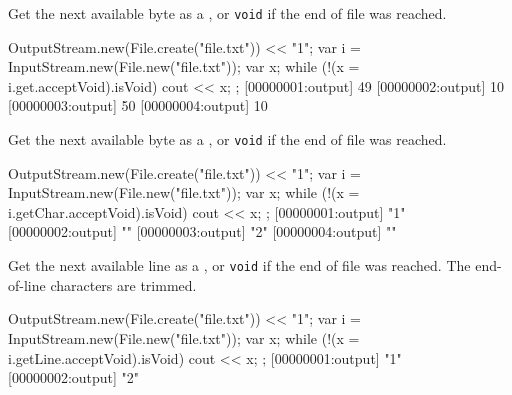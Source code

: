 \begin{urbiscriptapi}
\item[get]
  Get the next available byte as a , or
  \lstinline|void| if the end of file was reached.
\begin{urbiscript}
{
  OutputStream.new(File.create("file.txt")) << "1\n";
  var i = InputStream.new(File.new("file.txt"));
  var x;
  while (!(x = i.get.acceptVoid).isVoid)
    cout << x;
};
[00000001:output] 49
[00000002:output] 10
[00000003:output] 50
[00000004:output] 10
\end{urbiscript}

\item[getChar]
  Get the next available byte as a , or
  \lstinline|void| if the end of file was reached.
\begin{urbiscript}
{
  OutputStream.new(File.create("file.txt")) << "1\n";
  var i = InputStream.new(File.new("file.txt"));
  var x;
  while (!(x = i.getChar.acceptVoid).isVoid)
    cout << x;
};
[00000001:output] "1"
[00000002:output] "\n"
[00000003:output] "2"
[00000004:output] "\n"
\end{urbiscript}

\item[getLine]
  Get the next available line as a , or
  \lstinline|void| if the end of file was reached.  The end-of-line
  characters are trimmed.
\begin{urbiscript}
{
  OutputStream.new(File.create("file.txt")) << "1\n";
  var i = InputStream.new(File.new("file.txt"));
  var x;
  while (!(x = i.getLine.acceptVoid).isVoid)
    cout << x;
};
[00000001:output] "1"
[00000002:output] "2"
\end{urbiscript}
\end{urbiscriptapi}


